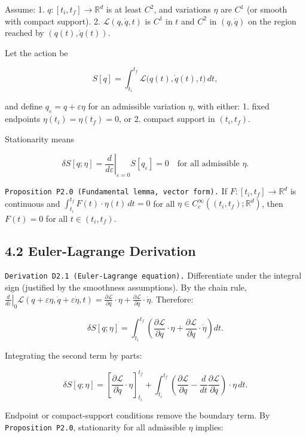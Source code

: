 \documentclass[
]{article}
\begin{document}
Assume: 1. \(q:[t_i,t_f]\to\mathbb R^d\) is at least \(C^2\), and
variations \(\eta\) are \(C^1\) (or smooth with compact support). 2.
\(\mathcal L(q,\dot q,t)\) is \(C^1\) in \(t\) and \(C^2\) in
\((q,\dot q)\) on the region reached by \((q(t),\dot q(t))\).

Let the action be

\[
S[q]=\int_{t_i}^{t_f}\mathcal L\big(q(t),\dot q(t),t\big)\,dt,
\]

and define \(q_\varepsilon=q+\varepsilon\eta\) for an admissible
variation \(\eta\), with either: 1. fixed endpoints
\(\eta(t_i)=\eta(t_f)=0\), or 2. compact support in \((t_i,t_f)\).

Stationarity means

\[
\delta S[q;\eta]
=\left.\frac{d}{d\varepsilon}\right|_{\varepsilon=0} S[q_\varepsilon]
=0
\quad\text{for all admissible }\eta.
\]

\texttt{Proposition\ P2.0\ (Fundamental\ lemma,\ vector\ form).} If
\(F:[t_i,t_f]\to\mathbb R^d\) is continuous and
\(\int_{t_i}^{t_f} F(t)\cdot\eta(t)\,dt=0\) for all
\(\eta\in C_c^\infty((t_i,t_f);\mathbb R^d)\), then \(F(t)=0\) for all
\(t\in(t_i,t_f)\).

\hypertarget{euler-lagrange-derivation}{%
\subsection{4.2 Euler-Lagrange
Derivation}\label{euler-lagrange-derivation}}

\texttt{Derivation\ D2.1\ (Euler-Lagrange\ equation).} Differentiate
under the integral sign (justified by the smoothness assumptions). By
the chain rule,
\(\left.\frac{d}{d\varepsilon}\right|_{0}\mathcal L(q+\varepsilon\eta,\dot q+\varepsilon\dot\eta,t) =\frac{\partial\mathcal L}{\partial q}\cdot\eta+\frac{\partial\mathcal L}{\partial\dot q}\cdot\dot\eta\).
Therefore:

\[
\delta S[q;\eta]
=\int_{t_i}^{t_f}
\left(
\frac{\partial\mathcal L}{\partial q}\cdot\eta
+
\frac{\partial\mathcal L}{\partial \dot q}\cdot\dot\eta
\right)dt.
\]

Integrating the second term by parts:

\[
\delta S[q;\eta]
=
\left[
\frac{\partial\mathcal L}{\partial\dot q}\cdot\eta
\right]_{t_i}^{t_f}
+
\int_{t_i}^{t_f}
\left(
\frac{\partial\mathcal L}{\partial q}
-\frac{d}{dt}\frac{\partial\mathcal L}{\partial\dot q}
\right)\cdot\eta\,dt.
\]

Endpoint or compact-support conditions remove the boundary term. By
\texttt{Proposition\ P2.0}, stationarity for all admissible \(\eta\)
implies:
\end{document}
